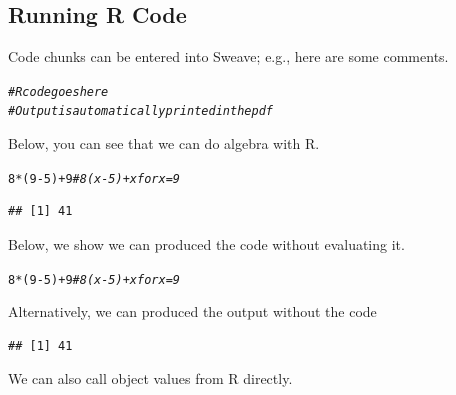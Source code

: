 \documentclass{article}\usepackage[]{graphicx}\usepackage[]{xcolor}
\makeatletter
\newcommand{\hlnum}[1]{\textcolor[rgb]{0.686,0.059,0.569}{#1}}%
\newcommand{\hlcom}[1]{\textcolor[rgb]{0.678,0.584,0.686}{\textit{#1}}}%
\newcommand{\hlopt}[1]{\textcolor[rgb]{0,0,0}{#1}}%
\newcommand{\hldef}[1]{\textcolor[rgb]{0.345,0.345,0.345}{#1}}%
\newenvironment{kframe}{%
 \def\at@end@of@kframe{}%
 \ifinner\ifhmode%
  \def\at@end@of@kframe{\end{minipage}}%
  \begin{minipage}{\columnwidth}%
 \fi\fi%
 \def\FrameCommand##1{\hskip\@totalleftmargin \hskip-\fboxsep
 \colorbox{shadecolor}{##1}\hskip-\fboxsep
     \hskip-\linewidth \hskip-\@totalleftmargin \hskip\columnwidth}%
 \MakeFramed {\advance\hsize-\width
   \@totalleftmargin\z@ \linewidth\hsize
   \@setminipage}}%
 {\par\unskip\endMakeFramed%
 \at@end@of@kframe}
\newenvironment{knitrout}{}{} %
\makeatother
\begin{document}
\begin{multicols}{2}
\subsection{Running R Code}
Code chunks can be entered into Sweave; e.g., here are some comments.
\begin{knitrout}\scriptsize
{}\color{fgcolor}\begin{kframe}
\begin{alltt}
\hlcom{# R code goes here}
\hlcom{# Output is automatically printed in the pdf}
\end{alltt}
\end{kframe}
\end{knitrout}
\indent Below, you can see that we can do algebra with R.
\begin{knitrout}\scriptsize
{}\color{fgcolor}\begin{kframe}
\begin{alltt}
\hlnum{8}\hlopt{*}\hldef{(}\hlnum{9}\hlopt{-}\hlnum{5}\hldef{)} \hlopt{+} \hlnum{9} \hlcom{# 8(x-5) + x for x = 9}
\end{alltt}
\begin{verbatim}
## [1] 41
\end{verbatim}
\end{kframe}
\end{knitrout}
\indent Below, we show we can produced the code without evaluating it.
\begin{knitrout}\scriptsize
{}\color{fgcolor}\begin{kframe}
\begin{alltt}
\hlnum{8}\hlopt{*}\hldef{(}\hlnum{9}\hlopt{-}\hlnum{5}\hldef{)} \hlopt{+} \hlnum{9} \hlcom{# 8(x-5) + x for x = 9}
\end{alltt}
\end{kframe}
\end{knitrout}
\indent Alternatively, we can produced the output without the code
\begin{knitrout}\scriptsize
{}\color{fgcolor}\begin{kframe}
\begin{verbatim}
## [1] 41
\end{verbatim}
\end{kframe}
\end{knitrout}
\indent We can also call object values from R directly.
\begin{knitrout}\scriptsize

\end{knitrout}
\end{multicols}
\end{document}
